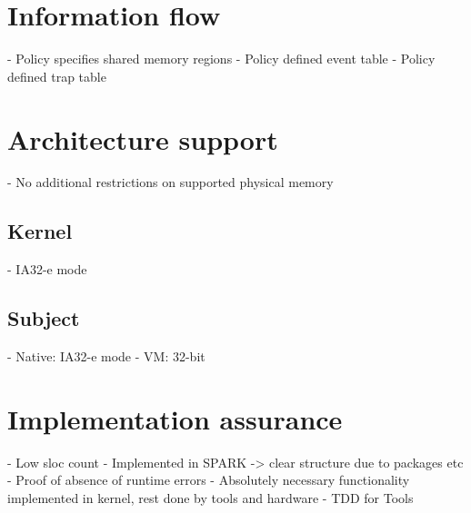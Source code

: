 \section{Information flow}
- Policy specifies shared memory regions
- Policy defined event table
- Policy defined trap table

\section{Architecture support}
- No additional restrictions on supported physical memory

\subsection{Kernel}
- IA32-e mode

\subsection{Subject}
- Native: IA32-e mode
- VM: 32-bit

\section{Implementation assurance}
- Low sloc count
- Implemented in SPARK -> clear structure due to packages etc
- Proof of absence of runtime errors
- Absolutely necessary functionality implemented in kernel, rest done by tools
  and hardware
- TDD for Tools

